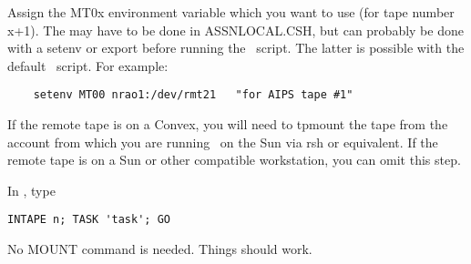 \normalstyle
Assign the MT0x environment variable which you want to use (for tape
number x+1).  The may have to be done in ASSNLOCAL.CSH, but can probably be
done with a setenv or export before running the \AIPS\ script.  The latter is
possible with the default \AIPS\ script.  For example:

\begin{verbatim}
	setenv MT00 nrao1:/dev/rmt21   "for AIPS tape #1"
\end{verbatim}

If the remote tape is on a Convex, you will need to tpmount the tape from
the account from which you are running \AIPS\ on the Sun via rsh or equivalent.
If the remote tape is on a Sun or other compatible workstation, you can omit
this step.

In \AIPS, type

\begin{verbatim}
INTAPE n; TASK 'task'; GO
\end{verbatim}

No MOUNT command is needed.  Things should work.



